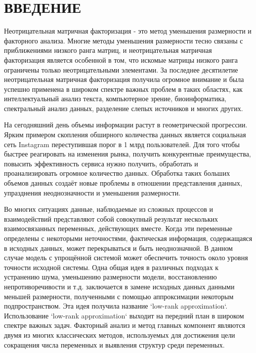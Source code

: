 

\chapter*{ВВЕДЕНИЕ}

Неотрицательная матричная факторизация - это метод уменьшения размерности и факторного анализа.
Многие методы уменьшения размерности тесно связаны с приближениями низкого ранга
матриц, и неотрицательная матричная факторизация является особенной в том,
что искомые матрицы низкого ранга ограничены только неотрицательными элементами.
За последнее десятилетие
неотрицательная матричная факторизация получила огромное внимание и была успешно применена в широком спектре
важных проблем в таких областях, как интеллектуальный анализ текста, компьютерное зрение,
биоинформатика, спектральный анализ данных, разделение слепых источников и многих других.

На сегодняшний день объемы информации растут в геометрической прогрессии.
Ярким примером  скопления обширного количества данных является социальная сеть Instagram переступившая порог в 1 млрд пользователей.
Для того чтобы быстрее реагировать на изменения рынка, получить конкурентные преимущества,
повысить эффективность сервиса нужно получить, обработать и проанализировать огромное количество данных.
Обработка таких больших объемов данных создаёт новые проблемы в отношении представления данных,
упразднения неоднозначности и уменьшения размерности.

Во многих ситуациях данные, наблюдаемые из сложных процессов и взаимодействий
представляют собой совокупный результат нескольких взаимосвязанных переменных, действующих вместе.
Когда эти переменные определены с некоторыми неточностями, фактическая информация, содержащаяся в исходных данных,
может перекрываться и быть неоднозначной.
В данном случае модель с упрощённой системой может обеспечить точность около уровня точности исходной системы.
Одна общая идея в различных подходах к устранению шума, уменьшению размерности модели,
восстановлению непротиворечивости и т.д. заключается в замене исходных данных данными меньшей размерности,
полученными с помощью аппроксимации некоторым подпространством.
Эта идея получила название `low-rank approximation`.
Использование `low-rank approximation` выходит на передний план в широком спектре важных задач.
Факторный анализ и метод главных компонент являются двумя из многих классических методов,
используемых для достижения цели сокращения числа переменных и выявления структур среди переменных.

